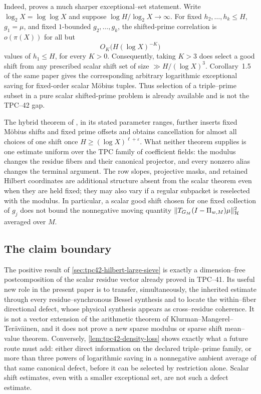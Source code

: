 Indeed, \citet[Theorem~6.3]{Lichtman2022} proves a much sharper
exceptional--set statement.  Write \(\log_2 X=\log\log X\) and suppose
\(\log H/\log_2 X\to\infty\).  For fixed \(h_2,\ldots,h_k\le H\),
\(g_1=\mu\), and fixed \(1\)-bounded \(g_2,\ldots,g_k\), the
shifted-prime correlation is \(o(\pi(X))\) for
all but
\begin{equation}
 O_K\bigl(H(\log X)^{-K}\bigr)
 \label{eq:tpc42-lichtman-exceptional-set}
\end{equation}
values of \(h_1\le H\), for every \(K>0\).  Consequently, taking \(K>3\)
does select a good shift from any prescribed scalar shift set of size
\(\gg H/(\log X)^3\).  Corollary~1.5 of the same paper gives the
corresponding arbitrary logarithmic exceptional saving for fixed-order
scalar M\"obius tuples.  Thus selection of a triple--prime subset in a
pure scalar shifted-prime problem is already available and is not the
TPC--42 gap.

The hybrid theorem of \citet{LichtmanTeravainen2022}, in its stated
parameter ranges, further inserts fixed M\"obius shifts and fixed prime
offsets and obtains cancellation for almost all choices of one shift
once \(H\ge(\log X)^{\ell+\varepsilon}\).  What neither theorem supplies
is one estimate uniform over the TPC family of coefficient fields:
the modulus changes the residue fibers and their canonical projector,
and every nonzero alias changes the terminal argument.  The row slopes,
projective masks, and retained Hilbert coordinates are additional
structure absent from the scalar theorem even when they are held fixed;
they may also vary if a regular subpacket is reselected with the modulus.
In particular, a scalar good shift chosen for one fixed
collection of \(g_j\) does not bound the nonnegative moving quantity
\(\|T_{G_M}(I-\Pi_{w,M})\mu\|_{\mathcal H}^{2}\) averaged over \(M\).

\subsection{The claim boundary}

The positive result of \cref{sec:tpc42-hilbert-large-sieve} is exactly a
dimension--free postcomposition of the scalar residue vector already
proved in TPC--41.  Its useful new role in the present paper is to
transfer, simultaneously, the inherited estimate through every
residue--synchronous Bessel synthesis and to locate the within--fiber
directional defect, whose physical synthesis appears as cross--residue
coherence.  It is
not a vector extension of the arithmetic theorem of
Klurman--Mangerel--Ter\"av\"ainen, and it does not prove a new sparse
modulus or sparse shift mean--value theorem.  Conversely,
\cref{lem:tpc42-density-loss} shows exactly what a future route must add:
either direct information on the declared triple--prime family, or more
than three powers of logarithmic saving in a nonnegative ambient average
of that same canonical defect, before it can be selected by restriction
alone.  Scalar shift estimates, even with a smaller exceptional set, are
not such a defect estimate.
